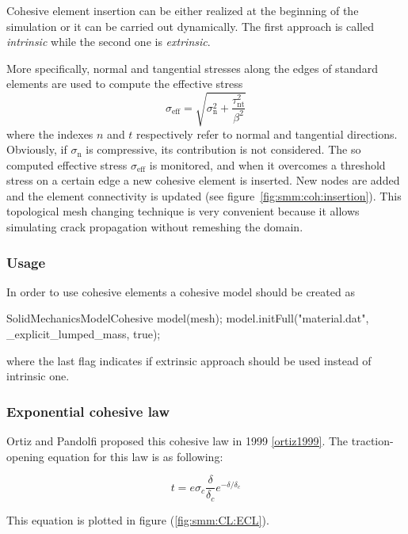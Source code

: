 Cohesive element insertion can be either realized at the beginning of
the simulation or it can be carried out dynamically. The first
approach is called \emph{intrinsic} while the second one is
\emph{extrinsic}.

More
specifically, normal and tangential stresses along the edges of
standard elements are used to compute the effective stress
\begin{equation}
  \sigma_\mathrm{eff} = \sqrt{\sigma_\mathrm{n}^2 +
    \frac{\tau_\mathrm{nt}^2}{\beta^2}}
\end{equation}
where the indexes $n$ and $t$ respectively refer to normal and
tangential directions. Obviously, if $\sigma_\mathrm{n}$ is
compressive, its contribution is not considered. The so computed
effective stress $\sigma_\mathrm{eff}$ is monitored, and when it
overcomes a threshold stress on a certain edge a new cohesive element
is inserted. New nodes are added and the element connectivity is
updated (see figure~\ref{fig:smm:coh:insertion}). This topological
mesh changing technique is very convenient because it allows
simulating crack propagation without remeshing the domain.

\subsubsection{Usage}
In order to use cohesive elements a cohesive model should be created
as
\begin{cpp}
  SolidMechanicsModelCohesive model(mesh);
  model.initFull("material.dat", _explicit_lumped_mass, true);
\end{cpp}
where the last flag indicates if extrinsic approach should be used
instead of intrinsic one.

\subsubsection{Exponential cohesive law}

Ortiz and Pandolfi proposed this cohesive law in 1999 \ref{ortiz1999}.  The
traction-opening equation for this law is as following:

\begin{equation}
  \label{eq:exponential_law}
  t = e \sigma_c \frac{\delta}{\delta_c}e^{-\delta/ \delta_c}
\end{equation}


This equation is plotted in figure (\ref{fig:smm:CL:ECL}).

